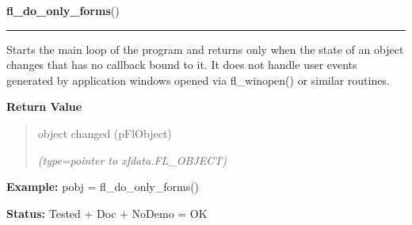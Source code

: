 \hspace{.8\funcindent}\begin{boxedminipage}{\funcwidth}

    \raggedright \textbf{fl\_do\_only\_forms}()

    \vspace{-1.5ex}

    \rule{\textwidth}{0.5\fboxrule}
\setlength{\parskip}{2ex}
    Starts the main loop of the program and returns only when the state of 
    an object changes that has no callback bound to it. It does not handle 
    user events generated by application windows opened via fl\_winopen() 
    or similar routines.

\setlength{\parskip}{1ex}
      \textbf{Return Value}
    \vspace{-1ex}

      \begin{quote}
      object changed (pFlObject)

      {\it (type=pointer to xfdata.FL\_OBJECT)}

      \end{quote}

\textbf{Example:} pobj = fl\_do\_only\_forms()



\textbf{Status:} Tested + Doc + NoDemo = OK



    \end{boxedminipage}

    \label{xformslib:flbasic:fl_check_only_forms}

    \vspace{0.5ex}

